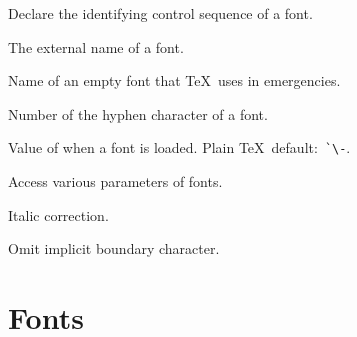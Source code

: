 \documentclass{book}
\begin{document}
\begin{inventory}
\item [\cs{font}]
      Declare the identifying control sequence of a font.

\item [\cs{fontname}]
      The external name of a font.

\item [\cs{nullfont}]
      Name of an empty font that \TeX\ uses in emergencies.


\item [\cs{hyphenchar}]
      Number of the hyphen character of a font.

\item [\cs{defaulthyphenchar}]
      Value of  when a font is loaded.
      Plain \TeX\ default:~\verb>`\->.

\item [\cs{fontdimen}]
      Access various parameters of fonts.

\item [\cs{char47}]
      Italic correction.

\item [\cs{noboundary}]
      Omit implicit boundary character.
\end{inventory}

\section{Fonts}
\end{document}
